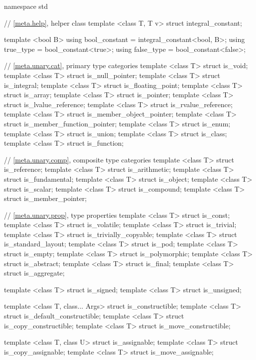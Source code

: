 %
%
\begin{codeblock}
namespace std {
  // \ref{meta.help}, helper class
  template <class T, T v> struct integral_constant;

  template <bool B>
    using bool_constant = integral_constant<bool, B>;
  using true_type  = bool_constant<true>;
  using false_type = bool_constant<false>;

  // \ref{meta.unary.cat}, primary type categories
  template <class T> struct is_void;
  template <class T> struct is_null_pointer;
  template <class T> struct is_integral;
  template <class T> struct is_floating_point;
  template <class T> struct is_array;
  template <class T> struct is_pointer;
  template <class T> struct is_lvalue_reference;
  template <class T> struct is_rvalue_reference;
  template <class T> struct is_member_object_pointer;
  template <class T> struct is_member_function_pointer;
  template <class T> struct is_enum;
  template <class T> struct is_union;
  template <class T> struct is_class;
  template <class T> struct is_function;

  // \ref{meta.unary.comp}, composite type categories
  template <class T> struct is_reference;
  template <class T> struct is_arithmetic;
  template <class T> struct is_fundamental;
  template <class T> struct is_object;
  template <class T> struct is_scalar;
  template <class T> struct is_compound;
  template <class T> struct is_member_pointer;

  // \ref{meta.unary.prop}, type properties
  template <class T> struct is_const;
  template <class T> struct is_volatile;
  template <class T> struct is_trivial;
  template <class T> struct is_trivially_copyable;
  template <class T> struct is_standard_layout;
  template <class T> struct is_pod;
  template <class T> struct is_empty;
  template <class T> struct is_polymorphic;
  template <class T> struct is_abstract;
  template <class T> struct is_final;
  template <class T> struct is_aggregate;

  template <class T> struct is_signed;
  template <class T> struct is_unsigned;

  template <class T, class... Args> struct is_constructible;
  template <class T> struct is_default_constructible;
  template <class T> struct is_copy_constructible;
  template <class T> struct is_move_constructible;

  template <class T, class U> struct is_assignable;
  template <class T> struct is_copy_assignable;
  template <class T> struct is_move_assignable;

}
\end{codeblock}
